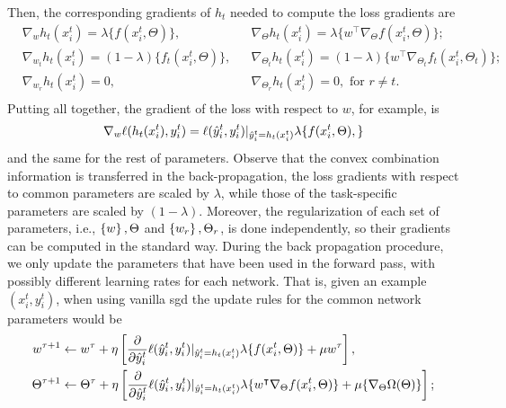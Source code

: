 Then, the corresponding gradients of $h_t$ needed to compute the loss gradients are
\begin{equation}\label{eq:gradients_losses} 
    \begin{aligned}       
        &\nabla_{w} h_t(x_i^t)  
        = \lambda \lbrace f(x_i^t, \Theta) \rbrace ,
        &&\nabla_{\Theta} h_t(x_i^t)  
        = \lambda \lbrace w^\intercal \nabla_\Theta f(x_i^t, \Theta)\rbrace ; \\
        &\nabla_{w_t} h_t(x_i^t)  
        = (1 - \lambda) \lbrace f_t(x_i^t, \Theta) \rbrace ,
        &&\nabla_{\Theta_t} h_t(x_i^t)  
        = (1 - \lambda) \lbrace  w^\intercal \nabla_{\Theta_t} f_t(x_i^t, \Theta_t)\rbrace ; \\
        &\nabla_{w_r} h_t(x_i^t)  
        =  0 , 
        &&\nabla_{\Theta_r} h_t(x_i^t)  
        =  0 , \text{ for } r \neq t .\\
    \end{aligned}    
\end{equation}
Putting all together, the gradient of the loss with respect to $w$, for example, is 
$$  \nabla_w \ell(h_t(x_i^t), y_i^t)  =\ell(\hat{y}_i^t, y_i^t) \vert_{\hat{y}_i^t = h_t(x_i^t)} \lambda \lbrace f(x_i^t, \Theta), \rbrace $$
and the same for the rest of parameters.
%
Observe that the convex combination information is transferred in the back-propagation, the loss gradients with respect to common parameters are scaled by $\lambda$, while those of the task-specific parameters are scaled by $(1 - \lambda)$.
%
Moreover, the regularization of each set of parameters, i.e., $\left\{w\right\}, \Theta$ and $\left\{w_r\right\}, \Theta_r$, is done independently, so their gradients can be computed in the standard way.
%
During the back propagation procedure, we only update the parameters that have been used in the forward pass, with possibly different learning rates for each network. 
That is, given an example $(x_i^t, y_i^t)$, when using vanilla \acrshort{sgd} the update rules for the common network parameters would be
\begin{equation}\label{eq:convexmtl_nn_commonupdate}
    \begin{aligned}
        w^{\tau + 1} &\gets w^\tau + \eta \left[  \frac{\partial}{\partial \hat{y}_i^t}  \lossf(\hat{y}_i^t, y_i^t) \vert_{\hat{y}_i^t = h_t(x_i^t)} \lambda \lbrace f(x_i^t, \Theta) \rbrace + \mu w^\tau \right], \\
        \Theta^{\tau + 1} &\gets \Theta^\tau + \eta \left[ \frac{\partial}{\partial \hat{y}_i^t}  \lossf(\hat{y}_i^t, y_i^t) \vert_{\hat{y}_i^t = h_t(x_i^t)}  \lambda \lbrace w^\intercal \nabla_\Theta f(x_i^t, \Theta)\rbrace + \mu \lbrace \nabla_\Theta \Omega( \Theta)  \rbrace \right];
    \end{aligned}
\end{equation}
